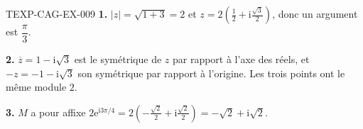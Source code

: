 \begin{corrige}{TEXP-CAG-EX-009}
\textbf{1.} $|z|=\sqrt{1+3}=2$ et
$z=2\left(\tfrac12+\mathrm{i}\tfrac{\sqrt3}{2}\right)$, donc un argument est
$\dfrac{\pi}{3}$.

\textbf{2.} $\overline{z}=1-\mathrm{i}\sqrt3$ est le symétrique de $z$ par
rapport à l'axe des réels, et $-z=-1-\mathrm{i}\sqrt3$ son symétrique par
rapport à l'origine. Les trois points ont le même module $2$.

\textbf{3.} $M$ a pour affixe
$2\mathrm{e}^{\mathrm{i}3\pi/4}
=2\left(-\tfrac{\sqrt2}{2}+\mathrm{i}\tfrac{\sqrt2}{2}\right)
=-\sqrt2+\mathrm{i}\sqrt2$.
\end{corrige}
